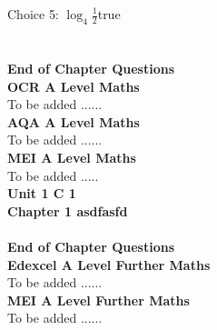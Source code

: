 \documentclass{article}
\begin{document}
Choice 5: \hspace{20pt}$\log_{4}\displaystyle\frac{1}{2}$\hspace{20pt}true\\
\\[4pt]
\\[2pt]
\noindent\large{\textbf{End of Chapter Questions}}\\[15pt]
\noindent\Huge{\textbf{OCR A Level Maths}}\\[5pt]
\noindent\large{To be added ......}\\[20pt]
\noindent\Huge{\textbf{AQA A Level Maths}}\\[5pt]
\noindent\large{To be added ......}\\[20pt]
\noindent\Huge{\textbf{MEI A Level Maths}}\\[5pt]
\noindent\large{To be added .....}\\[20pt]
\noindent\huge{\textbf{Unit 1 C 1}}\\[18pt]
\noindent\huge{\textbf{Chapter 1 asdfasfd}}\\[15pt]
\\[2pt]
\noindent\large{\textbf{End of Chapter Questions}}\\[15pt]
\noindent\Huge{\textbf{Edexcel A Level Further Maths}}\\[5pt]
\noindent\large{To be added ......}\\[20pt]
\noindent\Huge{\textbf{MEI A Level Further Maths}}\\[5pt]
\noindent\large{To be added ......}\\[20pt]
\end{document}

